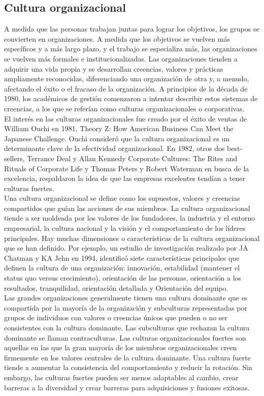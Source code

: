 \documentclass[10pt]{book}
\begin{document}
\subsection{Cultura organizacional}
A medida que las personas trabajan juntas para lograr los objetivos, los grupos se convierten en organizaciones. A medida que los objetivos se vuelven más específicos y a más largo plazo, y el trabajo se especializa más, las organizaciones se vuelven más formales e institucionalizadas. Las organizaciones tienden a adquirir una vida propia y se desarrollan creencias, valores y prácticas ampliamente reconocidas, diferenciando una organización de otra y, a menudo, afectando el éxito o el fracaso de la organización. A principios de la década de 1980, los académicos de gestión comenzaron a intentar describir estos sistemas de creencias, a los que se referían como culturas organizacionales o corporativas.\\
El interés en las culturas organizacionales fue creado por el éxito de ventas de William Ouchi en 1981, Theory Z: How American Business Can Meet the Japanese Challenge. Ouchi consideró que la cultura organizacional es un determinante clave de la efectividad organizacional. En 1982, otros dos best-sellers, Terrance Deal y Allan Kennedy Corporate Cultures: The Rites and Rituals of Corporate Life y Thomas Peters y Robert Waterman en busca de la excelencia, respaldaron la idea de que las empresas excelentes tendían a tener culturas fuertes.\\
Una cultura organizacional se define como los supuestos, valores y creencias compartidos que guían las acciones de sus miembros. La cultura organizacional tiende a ser moldeada por los valores de los fundadores, la industria y el entorno empresarial, la cultura nacional y la visión y el comportamiento de los líderes principales. Hay muchas dimensiones o características de la cultura organizacional que se han definido. Por ejemplo, un estudio de investigación realizado por JA Chatman y KA Jehn en 1994, identificó siete características principales que definen la cultura de una organización: innovación, estabilidad (mantener el status quo versus crecimiento), orientación de las personas, orientación a los resultados, tranquilidad, orientación detallada y Orientación del equipo.\\
Las grandes organizaciones generalmente tienen una cultura dominante que es compartida por la mayoría de la organización y subculturas representadas por grupos de individuos con valores o creencias únicos que pueden o no ser consistentes con la cultura dominante. Las subculturas que rechazan la cultura dominante se llaman contraculturas. Las culturas organizacionales fuertes son aquellas en las que la gran mayoría de los miembros organizacionales creen firmemente en los valores centrales de la cultura dominante. Una cultura fuerte tiende a aumentar la consistencia del comportamiento y reducir la rotación. Sin embargo, las culturas fuertes pueden ser menos adaptables al cambio, crear barreras a la diversidad y crear barreras para adquisiciones y fusiones exitosas.
\end{document}
